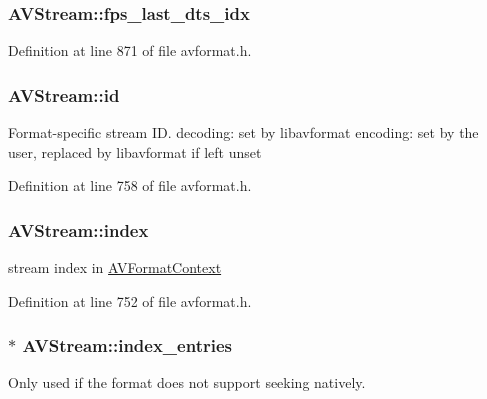 \subsubsection[{\texorpdfstring{fps\+\_\+last\+\_\+dts\+\_\+idx}{fps_last_dts_idx}}]{ A\+V\+Stream\+::fps\+\_\+last\+\_\+dts\+\_\+idx}\hypertarget{struct_a_v_stream_ac815be62a9c05f7da2e2665ee058014b}{}\label{struct_a_v_stream_ac815be62a9c05f7da2e2665ee058014b}


Definition at line 871 of file avformat.\+h.

\subsubsection[{\texorpdfstring{id}{id}}]{ A\+V\+Stream\+::id}\hypertarget{struct_a_v_stream_a6873ed62f196c24e8bf282609231786f}{}\label{struct_a_v_stream_a6873ed62f196c24e8bf282609231786f}
Format-\/specific stream ID. decoding\+: set by libavformat encoding\+: set by the user, replaced by libavformat if left unset 

Definition at line 758 of file avformat.\+h.

\subsubsection[{\texorpdfstring{index}{index}}]{ A\+V\+Stream\+::index}\hypertarget{struct_a_v_stream_a6ca823054632821e085377f7d371a2d1}{}\label{struct_a_v_stream_a6ca823054632821e085377f7d371a2d1}
stream index in \hyperlink{struct_a_v_format_context}{A\+V\+Format\+Context} 

Definition at line 752 of file avformat.\+h.

\subsubsection[{\texorpdfstring{index\+\_\+entries}{index_entries}}]{$\ast$ A\+V\+Stream\+::index\+\_\+entries}\hypertarget{struct_a_v_stream_abd901928978d19dc6dee65e88f28c6ad}{}\label{struct_a_v_stream_abd901928978d19dc6dee65e88f28c6ad}
Only used if the format does not support seeking natively. 

